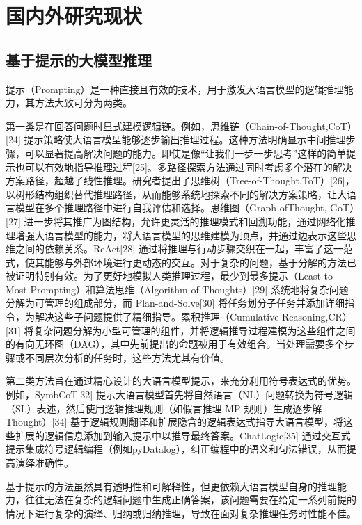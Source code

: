 \documentclass[12pt,a4paper,openright,UTF8]{ctexbook}
\begin{document}
\section{国内外研究现状}


\subsection{基于提示的大模型推理}

提示（Prompting）是一种直接且有效的技术，用于激发大语言模型的逻辑推理能力，其方法大致可分为两类。


第一类是在回答问题时显式建模逻辑链。例如，思维链（Chain-of-Thought,CoT）[24] 提示策略使大语言模型能够逐步输出推理过程。这种方法明确显示中间推理步骤，可以显著提高解决问题的能力。即使是像“让我们一步一步思考”这样的简单提示也可以有效地指导推理过程[25]。多路径探索方法通过同时考虑多个潜在的解决方案路径，超越了线性推理。研究者提出了思维树（Tree-of-Thought,ToT）[26]，以树形结构组织替代推理路径，从而能够系统地探索不同的解决方案策略，让大语言模型在多个推理路径中进行自我评估和选择。思维图（Graph-ofThought, GoT）[27] 进一步将其推广为图结构，允许更灵活的推理模式和回溯功能，通过网络化推理增强大语言模型的能力，将大语言模型的思维建模为顶点，并通过边表示这些思维之间的依赖关系。ReAct[28] 通过将推理与行动步骤交织在一起，丰富了这一范式，使其能够与外部环境进行更动态的交互。对于复杂的问题，基于分解的方法已被证明特别有效。为了更好地模拟人类推理过程，最少到最多提示（Least-to-Most Prompting）和算法思维（Algorithm of Thoughts）[29] 系统地将复杂问题分解为可管理的组成部分，而 Plan-and-Solve[30] 将任务划分子任务并添加详细指令，为解决这些子问题提供了精细指导。累积推理（Cumulative Reasoning,CR）[31] 将复杂问题分解为小型可管理的组件，并将逻辑推导过程建模为这些组件之间的有向无环图（DAG），其中先前提出的命题被用于有效组合。当处理需要多个步骤或不同层次分析的任务时，这些方法尤其有价值。


第二类方法旨在通过精心设计的大语言模型提示，来充分利用符号表达式的优势。例如，SymbCoT[32] 提示大语言模型首先将自然语言（NL）问题转换为符号逻辑（SL）表述，然后使用逻辑推理规则（如假言推理 MP 规则）生成逐步解Thought）[34] 基于逻辑规则翻译和扩展隐含的逻辑表达式指导大语言模型，将这些扩展的逻辑信息添加到输入提示中以推导最终答案。ChatLogic[35] 通过交互式提示集成符号逻辑编程（例如pyDatalog），纠正编程中的语义和句法错误，从而提高演绎准确性。


基于提示的方法虽然具有透明性和可解释性，但更依赖大语言模型自身的推理能力，往往无法在复杂的逻辑问题中生成正确答案，该问题需要在给定一系列前提的情况下进行复杂的演绎、归纳或归纳推理，导致在面对复杂推理任务时性能不佳。
\end{document}
